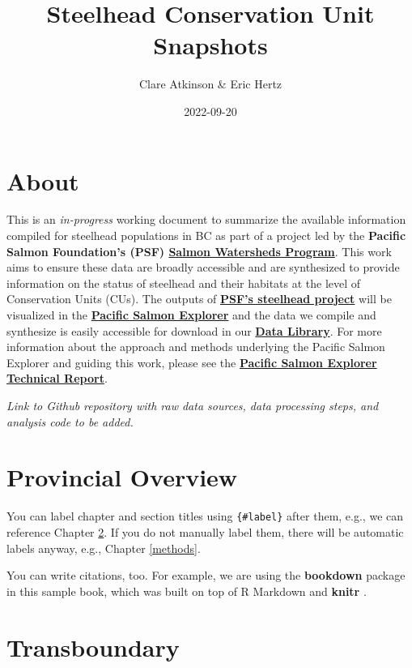 \documentclass[
]{book}
\title{Steelhead Conservation Unit Snapshots}
\author{Clare Atkinson \& Eric Hertz}
\date{2022-09-20}
\begin{document}
\maketitle

{
\setcounter{tocdepth}{1}
\tableofcontents
}
\hypertarget{about}{%
\chapter{About}\label{about}}

This is an \emph{in-progress} working document to summarize the available information compiled for steelhead populations in BC as part of a project led by the \textbf{Pacific Salmon Foundation's (PSF) \href{https://salmonwatersheds.ca/}{Salmon Watersheds Program}}. This work aims to ensure these data are broadly accessible and are synthesized to provide information on the status of steelhead and their habitats at the level of Conservation Units (CUs). The outputs of \textbf{\href{https://salmonwatersheds.ca/projects/steelhead-a-snapshot-of-bc-populations-and-their-habitats/}{PSF's steelhead project}} will be visualized in the \textbf{\href{https://www.salmonexplorer.ca/\#!/}{Pacific Salmon Explorer}} and the data we compile and synthesize is easily accessible for download in our \textbf{\href{https://data.salmonwatersheds.ca/data-library/}{Data Library}}. For more information about the approach and methods underlying the Pacific Salmon Explorer and guiding this work, please see the \textbf{\href{https://salmonwatersheds.ca/library/lib_475/}{Pacific Salmon Explorer Technical Report}}.

\emph{Link to Github repository with raw data sources, data processing steps, and analysis code to be added.}

\hypertarget{province}{%
\chapter{Provincial Overview}\label{province}}

You can label chapter and section titles using \texttt{\{\#label\}} after them, e.g., we can reference Chapter \ref{province}. If you do not manually label them, there will be automatic labels anyway, e.g., Chapter \ref{methods}.

You can write citations, too. For example, we are using the \textbf{bookdown} package \citep{R-bookdown} in this sample book, which was built on top of R Markdown and \textbf{knitr} \citep{xie2015}.

\hypertarget{tbr}{%
\chapter{Transboundary}\label{tbr}}
\end{document}
